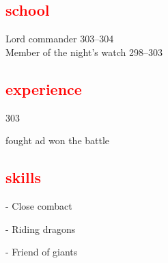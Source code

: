 \documentclass{my_cv}
\begin{document}
\begin{minipage}{0.45\textwidth}
\vspace{1cm}

    \textcolor{red}{\section{school}}
    
    Lord commander 303--304 \\
    Member of the night's watch 298--303
    
    
   
    
    \textcolor{red}{\section{experience}}
    
     {303} 
    
   fought ad won the battle
    
    

    \textcolor{red}{\section{skills}}
    
    - Close combact
    
    - Riding dragons

    - Friend of giants
    
\end{minipage}
\end{document}

